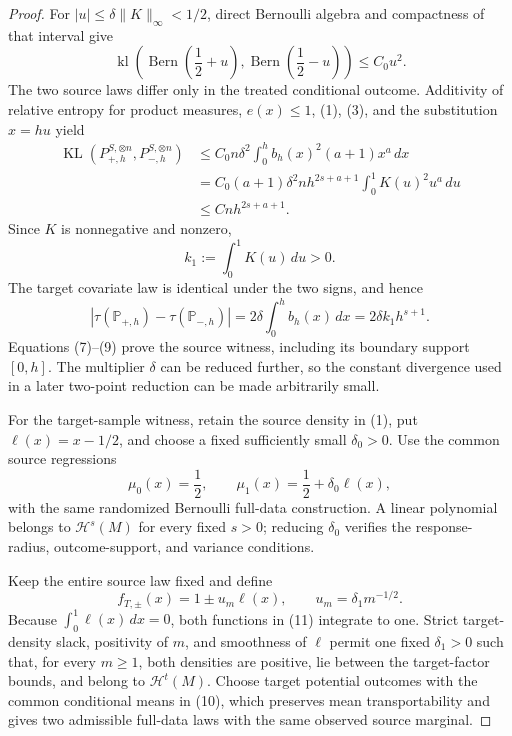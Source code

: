 \documentclass{article}
\begin{document}
\begin{proof}
For \(|u|\le\delta\lVert K\rVert_\infty<1/2\), direct Bernoulli algebra and compactness of that interval give
\[
\operatorname{kl}\!\left(\operatorname{Bern}\!\left(\frac12+u\right),
\operatorname{Bern}\!\left(\frac12-u\right)\right)
\le C_0u^2.
\tag{6}
\]
The two source laws differ only in the treated conditional outcome. Additivity of relative entropy for product measures, \(e(x)\le1\), (1), (3), and the substitution \(x=hu\) yield
\[
\begin{aligned}
\operatorname{KL}(P_{+,h}^{S,\otimes n},P_{-,h}^{S,\otimes n})
&\le C_0n\delta^2\int_0^hb_h(x)^2(a+1)x^a\,dx\\
&=C_0(a+1)\delta^2nh^{2s+a+1}
  \int_0^1K(u)^2u^a\,du\\
&\le Cnh^{2s+a+1}.
\end{aligned}
\tag{7}
\]
Since \(K\) is nonnegative and nonzero,
\[
k_1:=\int_0^1K(u)\,du>0.
\tag{8}
\]
The target covariate law is identical under the two signs, and hence
\[
|\tau(\mathbb P_{+,h})-\tau(\mathbb P_{-,h})|
=2\delta\int_0^hb_h(x)\,dx
=2\delta k_1h^{s+1}.
\tag{9}
\]
Equations (7)--(9) prove the source witness, including its boundary support \([0,h]\). The multiplier \(\delta\) can be reduced further, so the constant divergence used in a later two-point reduction can be made arbitrarily small.

For the target-sample witness, retain the source density in (1), put \(\ell(x)=x-1/2\), and choose a fixed sufficiently small \(\delta_0>0\). Use the common source regressions
\[
\mu_0(x)=\frac12,
\qquad
\mu_1(x)=\frac12+\delta_0\ell(x),
\tag{10}
\]
with the same randomized Bernoulli full-data construction. A linear polynomial belongs to \(\mathcal H^s(M)\) for every fixed \(s>0\); reducing \(\delta_0\) verifies the response-radius, outcome-support, and variance conditions.

Keep the entire source law fixed and define
\[
f_{T,\pm}(x)=1\pm u_m\ell(x),
\qquad
u_m=\delta_1m^{-1/2}.
\tag{11}
\]
Because \(\int_0^1\ell(x)\,dx=0\), both functions in (11) integrate to one. Strict target-density slack, positivity of \(m\), and smoothness of \(\ell\) permit one fixed \(\delta_1>0\) such that, for every \(m\ge1\), both densities are positive, lie between the target-factor bounds, and belong to \(\mathcal H^t(M)\). Choose target potential outcomes with the common conditional means in (10), which preserves mean transportability and gives two admissible full-data laws with the same observed source marginal.


\end{proof}
\end{document}
